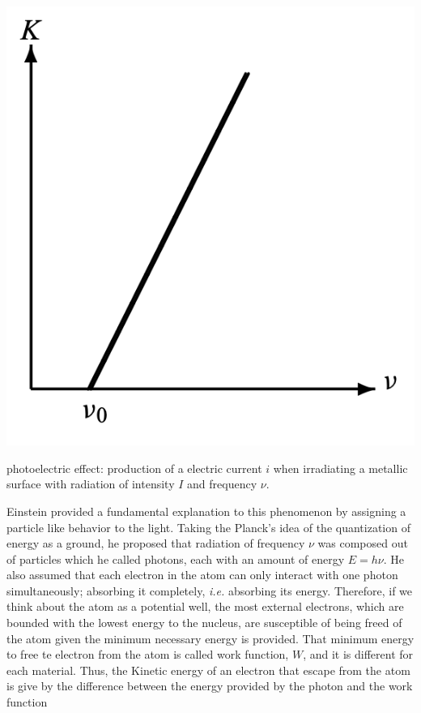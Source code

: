 \documentclass{article}
\begin{document}
\begin{marginfigure}%
  \includegraphics[width=\linewidth]{figures/photoelectric_plot.png}
  \caption{photoelectric effect: production of a electric current $i$ when irradiating a metallic surface with radiation of intensity $I$ and frequency $\nu$.}
  \label{fig:photolectric_plot}
\end{marginfigure}
 Einstein provided a fundamental explanation to this phenomenon by assigning a particle like behavior to the light. Taking the Planck's idea of the quantization of energy as a ground, he proposed that radiation of frequency $\nu$ was composed out of particles which he called photons, each with an amount of energy $E=h\nu$. He also assumed that each electron in the atom can only interact with one photon simultaneously; absorbing it completely, \textit{i.e.} absorbing its energy. Therefore, if we think about the atom as a potential well, the most external electrons, which are bounded with the lowest energy to the nucleus, are susceptible of being freed of the atom given the minimum necessary energy is provided. That minimum energy to free te electron from the atom is called work function, $W$, and it is different for each material. Thus, the Kinetic energy of an electron that escape from the atom is give by the difference between the energy provided by the photon and the work function
\end{document}
